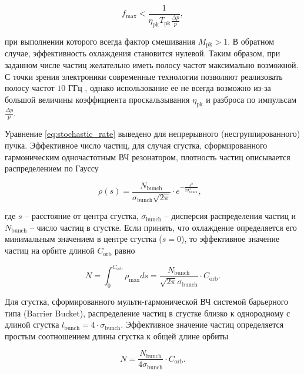 \begin{equation}
f_{\textrm{max}}<\frac{1}{\eta_{\textrm{pk}}T_{\textrm{pk}}\frac{\Delta p}{p}},
\end{equation}	

\noindent при выполнении которого всегда фактор смешивания $M_{\textrm{pk}}>1$. В обратном случае, эффективность охлаждения становится нулевой. Таким образом, при заданном числе частиц желательно иметь полосу частот максимально возможной. С точки зрения электроники современные технологии позволяют реализовать полосу частот $10$ ГГц \cite{caspers:stochastic}, однако использование ее не всегда возможно из-за большой величины коэффициента проскальзывания $\eta_{\textrm{pk}}$ и разброса по импульсам $\frac{\Delta p}{p}$.

\noindent Уравнение \ref{eq:stochastic_rate} выведено для непрерывного (несгруппированного) пучка.  Эффективное число частиц, для случая сгустка, сформированного гармоническим одночастотным ВЧ резонатором, плотность частиц описывается распределением по Гауссу

\begin{equation}
\rho(s)=\frac{N_{\textrm{bunch}}}{\sigma_{\textrm{bunch}}\sqrt{2\pi}}\cdot e^{-\frac{s^2}{2\sigma_{\textrm{bunch}}^2}},\ \ \ 
\end{equation}	

\noindent где $s$ – расстояние от центра сгустка, $\sigma_{\textrm{bunch}}$ – дисперсия распределения частиц и $N_{\textrm{bunch}}$ – число частиц в сгустке. Если принять, что охлаждение определяется его минимальным значением в центре сгустка ($s=0$), то эффективное значение частиц на орбите длиной $C_{\textrm{orb}}$ равно

\begin{equation}
N=\int_{0}^{C_{\textrm{orb}}}{\rho_{\textrm{max}}ds}=\frac{N_{\textrm{bunch}}}{\sqrt{2\pi}\sigma_{\textrm{bunch}}}\cdot C_{\textrm{orb}}.
\end{equation}

\noindent Для сгустка, сформированного мульти-гармонической ВЧ системой барьерного типа (Barrier Bucket), распределение частиц в сгустке близко к однородному с длиной сгустка $l_{\textrm{bunch}}=4\cdot\sigma_{\textrm{bunch}}$. Эффективное значение частиц определяется простым соотношением длины сгустка к общей длине орбиты

\begin{equation}
N=\frac{N_{\textrm{bunch}}}{{4\sigma}_{\textrm{bunch}}}\cdot C_{\textrm{orb}}.
\end{equation}

